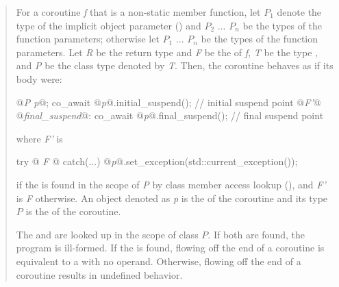 \begin{quote}
\pnum
For a coroutine \textit{f} that is a non-static member function, let $P_1$ denote the type of the implicit object parameter () and $P_2$ ... $P_n$ be the types of the function parameters; otherwise let $P_1$ ... $P_n$ be the types of the function parameters.
Let \textit{R} be the return type and \textit{F} be the 
of \textit{f}, \textit{T} be the type , and \textit{P} be the class type denoted by \textit{T}. 
Then, the coroutine behaves as if its body were:
\begin{codeblock}
  {
     @\textit{P p}@;
     co_await @\textit{p}@.initial_suspend(); // initial suspend point
     @\textit{F'}@
  @\textit{final_suspend}@:
     co_await @\textit{p}@.final_suspend(); // final suspend point
  }
\end{codeblock}
where \textit{F'} is 
\begin{codeblock}
	try {@\textit{ F }@} catch(...) { @\textit{p}@.set_exception(std::current_exception()); }
\end{codeblock}
if the   is found in the scope of \textit{P}
by class member access lookup (), and \textit{F'} is \textit{F} otherwise.
An object denoted as \textit{p} is the  of
the coroutine and its type $P$ is the 
of the coroutine.

\pnum
The 
 and  are looked up in the scope of class $P$. 
If both are found, the program is ill-formed. 
If the   is found, flowing off the end of a coroutine is equivalent to a  with no operand. Otherwise, flowing off the end of a coroutine results in undefined behavior.



\end{quote}
